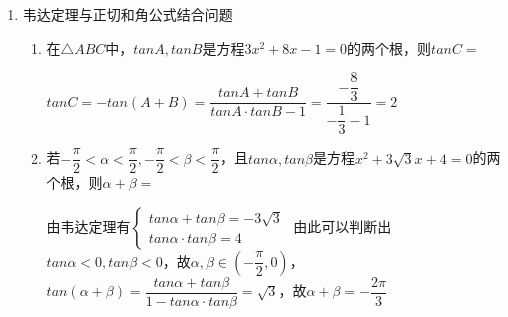 \begin{enumerate}
\begin{enumerate}
\begin{jieda}
            两式平方相加有$1 = 2 - 2cos(\alpha - \beta)$，故$cos(\alpha - \beta) = \dfrac{1}{2}$， $\alpha - \beta = 2k\pi + \dfrac{\pi}{3}$或$2k\pi - \dfrac{\pi}{3}, k \in \mathbf{Z}$. \\
            由于$\alpha, \beta$都是锐角，所以$\alpha - \beta \in (-\dfrac{\pi}{2}, \dfrac{\pi}{2})$，故$\alpha - \beta = \pm \dfrac{\pi}{3}$，又因为$cos\gamma = cos\alpha - cos\beta > 0$，所以$\alpha < \beta$，故$\alpha - \beta = -\dfrac{\pi}{3}$
        \end{jieda}
        \item 下面这道填空题因印刷原因造成在横线上的内容无法认清，现知结论，请在横线上填写原题的一个条件。题目：已知$\alpha, \beta$均为锐角，且$sin\alpha - cos\beta = -\dfrac{1}{2}, $，则$sin(\alpha - \beta) = \dfrac{59}{72}$
        \begin{jieda}
            若给$cos\alpha + sin\beta$的值，则两式平方后可以利用平方关系得到$sin(\alpha - \beta)$\\
            设$cos\alpha + sin\beta = k$，则$2 - 2sin(\alpha - \beta) = \dfrac{1}{4} + k^2$，解得$k = \dfrac{1}{3}$
        \end{jieda}
    \end{enumerate}
    \item 韦达定理与正切和角公式结合问题
    \begin{enumerate}
        \item 在$\triangle ABC$中，$tanA, tanB$是方程$3x^2+8x-1= 0$的两个根，则$tanC =$
        \begin{jieda}
            $tanC = - tan(A+B) = \dfrac{tanA + tanB}{tanA \cdot tanB - 1} = \dfrac{-\dfrac{8}{3}}{-\dfrac{1}{3} - 1} = 2$
        \end{jieda}
    \item 若$-\dfrac{\pi}{2} < \alpha < \dfrac{\pi}{2}, -\dfrac{\pi}{2} < \beta < \dfrac{\pi}{2}$，且$tan\alpha, tan\beta$是方程$x^2+3\sqrt{3}x+4 = 0$的两个根，则$\alpha+\beta = $
    \begin{jieda}
        由韦达定理有$\left \{ \begin{array}{l}
             tan\alpha + tan\beta = -3\sqrt{3}  \\
             tan\alpha \cdot tan\beta = 4
        \end{array}\right.$
        由此可以判断出$tan\alpha < 0, tan\beta < 0$，故$\alpha, \beta \in (-\dfrac{\pi}{2}, 0)$，$tan(\alpha+\beta) = \dfrac{tan\alpha + tan\beta}{1 - tan\alpha \cdot tan\beta} = \sqrt{3}$，故$\alpha + \beta = -\dfrac{2\pi}{3}$

\end{jieda}
\end{enumerate}
\end{enumerate}
